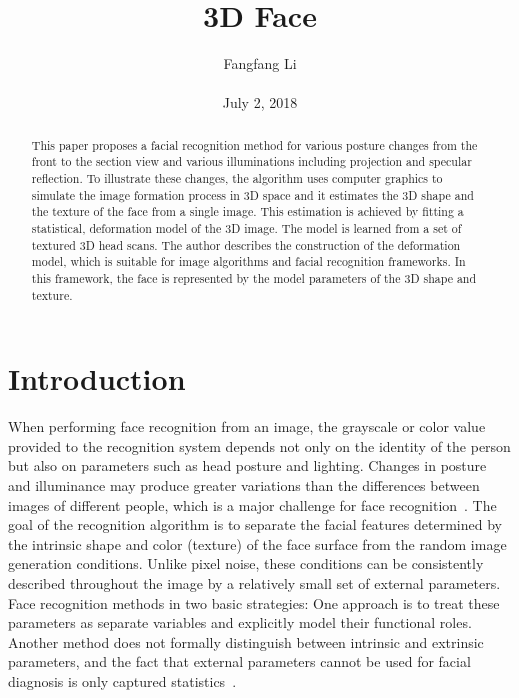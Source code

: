 \documentclass[10pt,twocolumn,letterpaper]{article}
\begin{document}
\title{\textbf{3D Face }}
\author{Fangfang Li\\\\July 2, 2018}
\maketitle
\begin{abstract}
This paper proposes a facial recognition method for various posture changes from the front to the section view and various illuminations including projection and specular reflection. To illustrate these changes, the algorithm uses computer graphics to simulate the image formation process in 3D space and it estimates the 3D shape and the texture of the face from a single image. This estimation is achieved by fitting a statistical, deformation model of the 3D image. The model is learned from a set of textured 3D head scans. The author describes the construction of the deformation model, which is suitable for image algorithms and facial recognition frameworks. In this framework, the face is represented by the model parameters of the 3D shape and texture.
\end{abstract}
\section{Introduction}
When performing face recognition from an image, the grayscale or color value provided to the recognition system depends not only on the identity of the person but also on parameters such as head posture and lighting. Changes in posture and illuminance may produce greater variations than the differences between images of different people, which is a major challenge for face recognition~\cite{Liu2016Joint}. The goal of the recognition algorithm is to separate the facial features determined by the intrinsic shape and color (texture) of the face surface from the random image generation conditions. Unlike pixel noise, these conditions can be consistently described throughout the image by a relatively small set of external parameters. Face recognition methods in two basic strategies: One approach is to treat these parameters as separate variables and explicitly model their functional roles. Another method does not formally distinguish between intrinsic and extrinsic parameters, and the fact that external parameters cannot be used for facial diagnosis is only captured statistics~\cite{Lin2010Accurate}.
\end{document}
